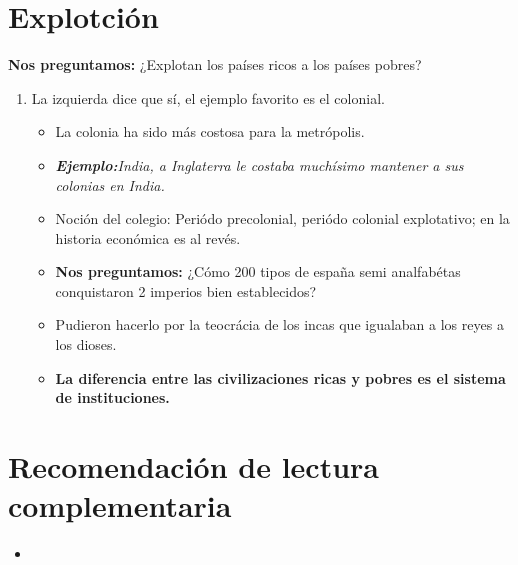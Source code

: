 \section{Explotción}
\textbf{Nos preguntamos:} ¿Explotan los países ricos a los países pobres?
\begin{enumerate}
    \item La izquierda dice que sí, el ejemplo favorito es el colonial.
    \begin{itemize}
        \item La colonia ha sido más costosa para la metrópolis.
        \item \emph{\textbf{Ejemplo:}India, a Inglaterra le costaba muchísimo mantener a sus colonias en India.}
        \item Noción del colegio: Periódo precolonial, periódo colonial explotativo; en la historia económica es al revés.
        \item \textbf{Nos preguntamos:} ¿Cómo 200 tipos de españa semi analfabétas conquistaron 2 imperios bien establecidos?
        \item Pudieron hacerlo por la teocrácia de los incas que igualaban a los reyes a los dioses.
        \item \textbf{La diferencia entre las civilizaciones ricas y pobres es el sistema de instituciones.}
    \end{itemize}
\end{enumerate}

\section{Recomendación de lectura complementaria}
\begin{itemize}
    \item 
\end{itemize}
